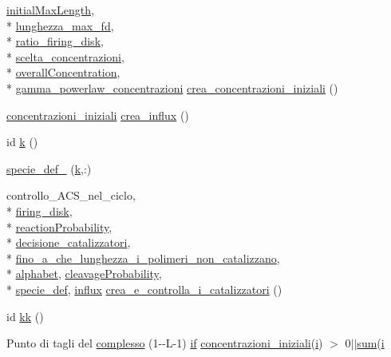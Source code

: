 \begin{DoxyCompactItemize}
\hyperlink{a00112_a4c7433c24b6426a15069cc5a93a5cbec}{initial\-Max\-Length}, \\*
\hyperlink{a00113_a7c974cc56015b6503e0619d32ebd4180}{lunghezza\-\_\-max\-\_\-fd}, \\*
\hyperlink{a00112_acd685f63a27f53fc049aff633634ddd6}{ratio\-\_\-firing\-\_\-disk}, \\*
\hyperlink{a00113_ac60b74a4c1b8bc23e64008ba1e0c41a8}{scelta\-\_\-concentrazioni}, \\*
\hyperlink{a00113_a59597688ed79473c0234f45eb9167574}{overall\-Concentration}, \\*
\hyperlink{a00113_a7cd0915d7542523abc226a8eecf67ecf}{gamma\-\_\-powerlaw\-\_\-concentrazioni} \hyperlink{a00110_a46820e2abe661887eb3c03ebcdd5aa14}{crea\-\_\-concentrazioni\-\_\-iniziali} ()
\item 
\hyperlink{a00103_a89801fa89eee3ba40f6610f290d6f6c3}{concentrazioni\-\_\-iniziali} \hyperlink{a00110_aedefd8a9b5b6248834cd58472da4be7d}{crea\-\_\-influx} ()
\item 
id \hyperlink{a00110_abf70355c2e58f64c6b18bda1b9bccfd7}{k} ()
\item 
\hyperlink{a00110_a206c02e53d19e1a7f6c297114dd5becb}{specie\-\_\-def\-\_} (\hyperlink{a00110_abf70355c2e58f64c6b18bda1b9bccfd7}{k},\-:)
\item 
controllo\-\_\-\-A\-C\-S\-\_\-nel\-\_\-ciclo, \\*
\hyperlink{a00103_acb72987b5000cf59c6f81c482e2ac8ac}{firing\-\_\-disk}, \\*
\hyperlink{a00113_a9101beaeb03fddb5c6a9e68442177543}{reaction\-Probability}, \\*
\hyperlink{a00113_a78948f867453293fcff0835b1bb05b8c}{decisione\-\_\-catalizzatori}, \\*
\hyperlink{a00113_ab6966d9ee620bc7376dc41a38352b948}{fino\-\_\-a\-\_\-che\-\_\-lunghezza\-\_\-i\-\_\-polimeri\-\_\-non\-\_\-catalizzano}, \\*
\hyperlink{a00113_abcbc32fc68e4323620d6171a17310212}{alphabet}, \hyperlink{a00113_a9d512df05ee559766d2b8f08e4704b04}{cleavage\-Probability}, \\*
\hyperlink{a00110_a85d979dc881d9a49537b0f43daa2b360}{specie\-\_\-def}, \hyperlink{a00107_a902e747aeec6b345d3a057099152f41f}{influx} \hyperlink{a00110_a369160212da6ddc667d7c8e245ed8b24}{crea\-\_\-e\-\_\-controlla\-\_\-i\-\_\-catalizzatori} ()
\item 
id \hyperlink{a00110_a262053c6a2b2b257b33309d12f8f7ba7}{kk} ()
\item 
Punto di tagli del \hyperlink{a00110_ad4d1a2311b23c0f860b99297ddc57214}{complesso} (1-\/-\/L-\/1) \hyperlink{a00030_a01d55766b8058903dd360b4bda71f9f5}{if} \hyperlink{a00103_a89801fa89eee3ba40f6610f290d6f6c3}{concentrazioni\-\_\-iniziali}(\hyperlink{a00113_ad3efca1ea6e3333daf30719ee0501862}{i}) $>$ 0$|$$|$\hyperlink{a00106_a59a869fb2b28d56dacd91c09e1dffc8d}{sum}(\hyperlink{a00113_ad3efca1ea6e3333daf30719ee0501862}{i}
$$
\end{DoxyCompactItemize}
